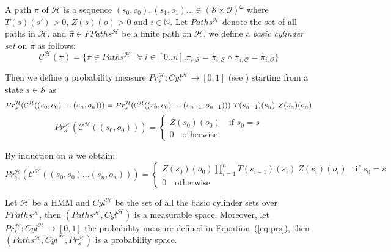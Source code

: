 A path $\pi$ of $\mathcal{H}$ is a sequence $(s_0,o_0),(s_1,o_1)\dots \in (\mathcal{S}\times\mathcal{O})^\omega $ where 
$T(s)(s')>0$, $Z(s)(o)>0$ and $i \in \mathbb{N}$.
Let $Paths^\mathcal{H}$ denote the set of all paths in $\mathcal{H}$. 
%
and $\hat\pi \in FPaths^\mathcal{H}$ be a finite path on $\mathcal{H}$, we define a \emph{basic cylinder set} on $\hat\pi$ as follows:
$$\mathcal{C}^\mathcal{H}(\hat\pi) = \{ \pi \in Paths^\mathcal{H}\ |\ \forall\ i \in [0..n] . \pi_{i,\mathcal{S}} = \hat\pi_{i,\mathcal{S}} \wedge \pi_{i,\mathcal{O}} = \hat\pi_{i,\mathcal{O}} \} $$

Then we define a probability measure $Pr_s^\mathcal{H} : Cyl^\mathcal{H} \rightarrow [0,1]$ (see \cite{ZhangHJ05}) starting from a state $s \in \mathcal{S}$ as
\begin{equation*}
Pr^\mathcal{H}_s(\mathcal{C}^\mathcal{H}((s_0,o_0)\dots(s_n,o_n))) = \\ 
Pr_s^\mathcal{H}(\mathcal{C}^\mathcal{H}((s_0,o_0)\dots(s_{n-1},o_{n-1})))\ T(s_{n-1})(s_n)\ Z(s_n)(o_n)
\end{equation*}
$$
Pr_s^\mathcal{H}(\mathcal{C}^\mathcal{H}((s_0,o_0))) = \begin{cases}
	Z(s_0)(o_0) \quad \text{if } s_0 = s\\
	0 \quad \text{otherwise}
\end{cases}
$$

By induction on $n$ we obtain:
\begin{equation}\label{eq:prs}
Pr_s^\mathcal{H}(\mathcal{C}^\mathcal{H}((s_0,o_0)\dots(s_n,o_n))) = \begin{cases}
	Z(s_0)(o_0)\prod_{i=1}^{n} T(s_{i-1})(s_i)\ Z(s_i)(o_i) \quad \text{if } s_0 = s \\
	0 \quad \text{otherwise}
\end{cases}
\end{equation}
\begin{proposition}
Let $\mathcal{H}$ be a \ac{HMM} and $Cyl^\mathcal{H}$ be the set of all the basic cylinder sets over $FPaths^\mathcal{H}$, then $(Paths^\mathcal{H},Cyl^\mathcal{H})$ is a measurable space. Moreover, let $Pr^\mathcal{H}_s : Cyl^\mathcal{H} \rightarrow [0,1]$ the probability measure defined in Equation~(\ref{eq:prs}), then $(Paths^\mathcal{H},Cyl^\mathcal{H},Pr_s^\mathcal{H})$ is a probability space.
\end{proposition}


